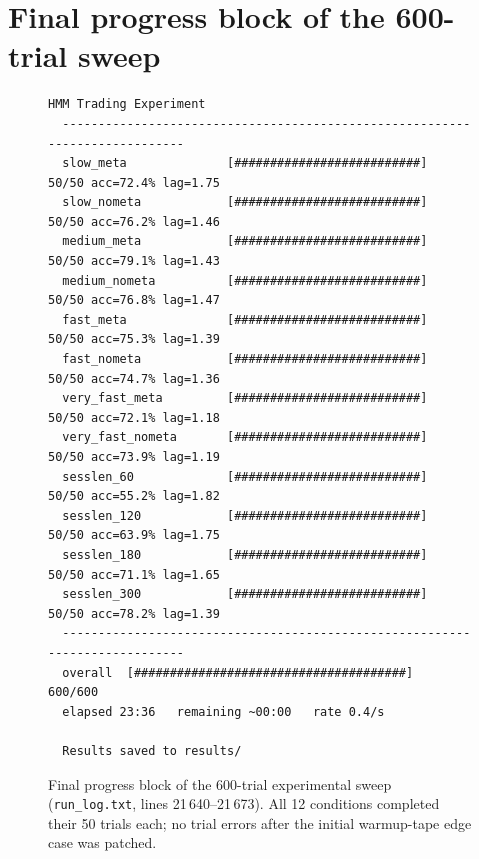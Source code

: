 \documentclass[11pt,a4paper]{article}
\begin{document}
\appendix
\section{Final progress block of the 600-trial sweep}\label{app:term}

\begin{figure}[h]
\begin{lstlisting}[style=terminal]
  HMM Trading Experiment
  ----------------------------------------------------------------------------
  slow_meta              [##########################]  50/50 acc=72.4% lag=1.75
  slow_nometa            [##########################]  50/50 acc=76.2% lag=1.46
  medium_meta            [##########################]  50/50 acc=79.1% lag=1.43
  medium_nometa          [##########################]  50/50 acc=76.8% lag=1.47
  fast_meta              [##########################]  50/50 acc=75.3% lag=1.39
  fast_nometa            [##########################]  50/50 acc=74.7% lag=1.36
  very_fast_meta         [##########################]  50/50 acc=72.1% lag=1.18
  very_fast_nometa       [##########################]  50/50 acc=73.9% lag=1.19
  sesslen_60             [##########################]  50/50 acc=55.2% lag=1.82
  sesslen_120            [##########################]  50/50 acc=63.9% lag=1.75
  sesslen_180            [##########################]  50/50 acc=71.1% lag=1.65
  sesslen_300            [##########################]  50/50 acc=78.2% lag=1.39
  ----------------------------------------------------------------------------
  overall  [######################################]  600/600
  elapsed 23:36   remaining ~00:00   rate 0.4/s

  Results saved to results/
\end{lstlisting}
\caption{Final progress block of the 600-trial experimental sweep
(\texttt{run\_log.txt}, lines 21\,640--21\,673). All 12 conditions completed
their 50 trials each; no trial errors after the initial warmup-tape edge
case was patched.}
\label{fig:term}
\end{figure}
\end{document}
